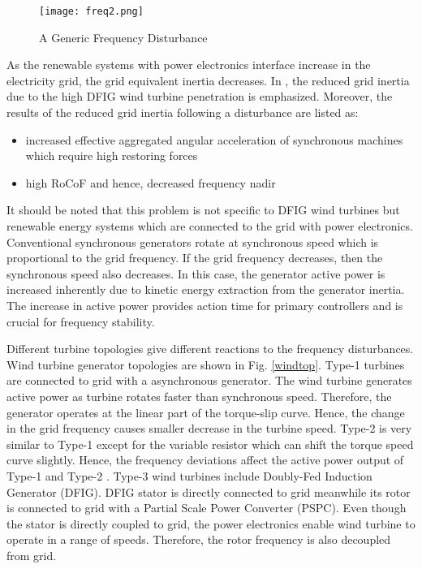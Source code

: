 \begin{figure}[h!]
	\centering
	\texttt{[image: freq2.png]}
	\caption{A Generic Frequency Disturbance}
	\label{freq2}
\end{figure}
As the renewable systems with power electronics interface increase in the electricity grid, the grid equivalent inertia decreases. In \cite{Gautam2011}, the reduced grid inertia due to the high DFIG wind turbine penetration is emphasized. Moreover, the results of the reduced grid inertia following a disturbance are listed as: 
\begin{itemize}
	\item increased effective aggregated angular acceleration of synchronous machines which require high restoring forces
	\item high RoCoF and hence, decreased frequency nadir
\end{itemize}
It should be noted that this problem is not specific to DFIG wind turbines but renewable energy systems which are connected to the grid with power electronics. Conventional synchronous generators rotate at synchronous speed which is proportional to the grid frequency. If the grid frequency decreases, then the synchronous speed also decreases. In this case, the generator active power is increased inherently due to kinetic energy extraction from the generator inertia. The increase in active power provides action time for primary controllers and is crucial for frequency stability. \par
Different turbine topologies give different reactions to the frequency disturbances. Wind turbine generator topologies are shown in Fig. \ref{windtop}. Type-1 turbines are connected to grid with a asynchronous generator. The wind turbine generates active power as turbine rotates faster than synchronous speed. Therefore, the generator operates at the linear part of the torque-slip curve. Hence, the change in the grid frequency causes smaller decrease in the turbine speed. Type-2 is very similar to Type-1 except for the variable resistor which can shift the torque speed curve slightly. Hence, the frequency deviations affect the active power output of Type-1 and Type-2 \cite{Muljadi2012}. Type-3 wind turbines include Doubly-Fed Induction Generator (DFIG). DFIG stator is directly connected to grid meanwhile its rotor is connected to grid with a Partial Scale Power Converter (PSPC). Even though the stator is directly coupled to grid, the power electronics enable wind turbine to operate in a range of speeds. Therefore, the rotor frequency is also decoupled from grid.\par
